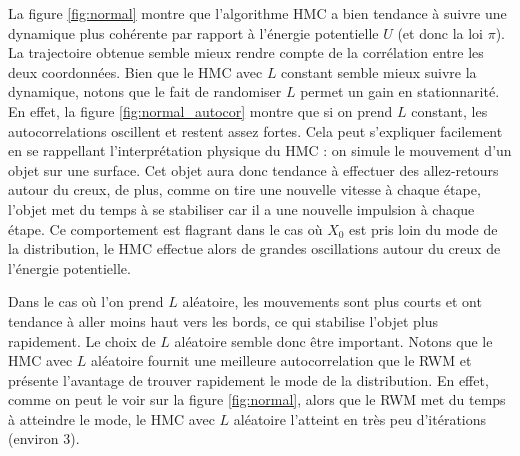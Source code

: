 \documentclass[10pt,a4paper]{article}
\begin{document}
La figure \ref{fig:normal} montre que l'algorithme HMC a bien tendance à suivre une dynamique plus cohérente par rapport à l'énergie potentielle $U$ (et donc la loi $\pi$). La trajectoire obtenue semble mieux rendre compte de la corrélation entre les deux coordonnées. Bien que le HMC avec $L$ constant semble mieux suivre la dynamique, notons que le fait de randomiser $L$ permet un gain en stationnarité. En effet, la figure \ref{fig:normal_autocor} montre que si on prend $L$ constant, les autocorrelations oscillent et restent assez fortes. Cela peut s'expliquer facilement en se rappellant l'interprétation physique du HMC : on simule le mouvement d'un objet sur une surface. Cet objet aura donc tendance à effectuer des allez-retours autour du creux, de plus, comme on tire une nouvelle vitesse à chaque étape, l'objet met du temps à se stabiliser car il a une nouvelle impulsion à chaque étape. Ce comportement est flagrant dans le cas où $X_0$ est pris loin du mode de la distribution, le HMC effectue alors de grandes oscillations autour du creux de l'énergie potentielle. 

Dans le cas où l'on prend $L$ aléatoire, les mouvements sont plus courts et ont tendance à aller moins haut vers les bords, ce qui stabilise l'objet plus rapidement. Le choix de $L$ aléatoire semble donc être important. Notons que le HMC avec $L$ aléatoire fournit une meilleure autocorrelation que le RWM et présente l'avantage de trouver rapidement le mode de la distribution. En effet, comme on peut le voir sur la figure \ref{fig:normal}, alors que le RWM met du temps à atteindre le mode, le HMC avec $L$ aléatoire l'atteint en très peu d'itérations (environ 3). 
\end{document}
